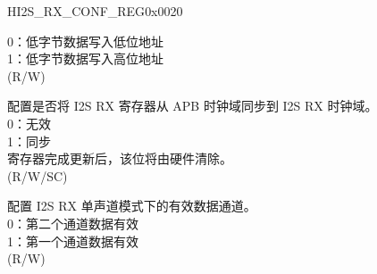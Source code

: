 \begin{register}{H}{I2S\_RX\_CONF\_REG}{0x0020}
\begin{regdesc}
\begin{reglist}
0：低字节数据写入低位地址\\
1：低字节数据写入高位地址\\
(R/W)
\label{fielddesc:I2SRXUPDATE}\item [I2S\_RX\_UPDATE] 配置是否将 I2S RX 寄存器从 APB 时钟域同步到 I2S RX 时钟域。\\
0：无效\\
1：同步\\
寄存器完成更新后，该位将由硬件清除。\\
(R/W/SC)
\label{fielddesc:I2SRXMONOFSTVLD}\item [I2S\_RX\_MONO\_FST\_VLD] 配置 I2S RX 单声道模式下的有效数据通道。\\
0：第二个通道数据有效\\
1：第一个通道数据有效\\
(R/W)

\item [见下页...]
\end{reglist}\end{regdesc}
\end{register}
\addtocounter{Regfloat}{-1}
